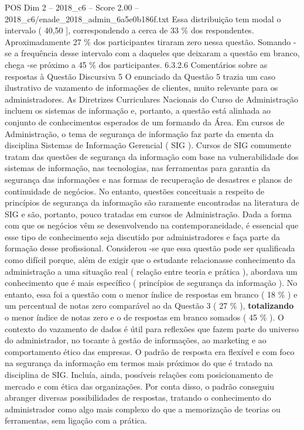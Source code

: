 \begin{textsample}{POS Dim 2 – 2018\_c6 – Score 2.00 – 2018\_c6/enade\_2018\_admin\_6a5e0b186f.txt}
Essa distribuição tem modal o intervalo ( 40,50 ], correspondendo a cerca de 33 \% dos respondentes.
Aproximadamente 27 \% dos participantes tiraram zero nessa questão.
Somando -se a frequência desse intervalo com a daqueles que deixaram a questão em branco, chega -se próximo a 45 \% dos participantes. 6.3.2.6 Comentários sobre as respostas à Questão Discursiva 5 O enunciado da Questão 5 trazia um caso ilustrativo de vazamento de informações de clientes, muito relevante para os administradores.
As Diretrizes Curriculares Nacionais do Curso de Administração incluem os sistemas de informação e, portanto, a questão está alinhada ao conjunto de conhecimentos esperados de um formando da Área.
Em cursos de Administração, o tema de segurança de informação faz parte da ementa da disciplina Sistemas de Informação Gerencial ( SIG ).
Cursos de SIG comumente tratam das questões de segurança da informação com base na vulnerabilidade dos sistemas de informação, nas tecnologias, nas ferramentas para garantia da segurança das informações e nas formas de recuperação de desastres e planos de continuidade de negócios.
No entanto, questões conceituais a respeito de princípios de segurança da informação são raramente encontradas na literatura de SIG e são, portanto, pouco tratadas em cursos de Administração.
Dada a forma com que os negócios vêm se desenvolvendo na contemporaneidade, é essencial que esse tipo de conhecimento seja discutido por administradores e faça parte da formação desse profissional.
Considerou -se que essa questão pode ser qualificada como difícil porque, além de exigir que o estudante relacionasse conhecimento da administração a uma situação real ( relação entre teoria e prática ), abordava um conhecimento que é mais específico ( princípios de segurança da informação ).
No entanto, essa foi a questão com o menor índice de respostas em branco ( 18 \% ) e um percentual de notas zero comparável ao da Questão 3 ( 27 \% ), \textbf{totalizando} o menor índice de notas zero e o de respostas em branco somados ( 45 \% ).
O contexto do vazamento de dados é útil para reflexões que fazem parte do universo do administrador, no tocante à gestão de informações, ao marketing e ao comportamento ético das empresas.
O padrão de resposta era flexível e com foco na segurança da informação em termos mais próximos do que é tratado na disciplina de SIG.
Incluía, ainda, possíveis relações com posicionamento de mercado e com ética das organizações.
Por conta disso, o padrão conseguiu abranger diversas possibilidades de respostas, tratando o conhecimento do administrador como algo mais complexo do que a memorização de teorias ou ferramentas, sem ligação com a prática.

\end{textsample}
